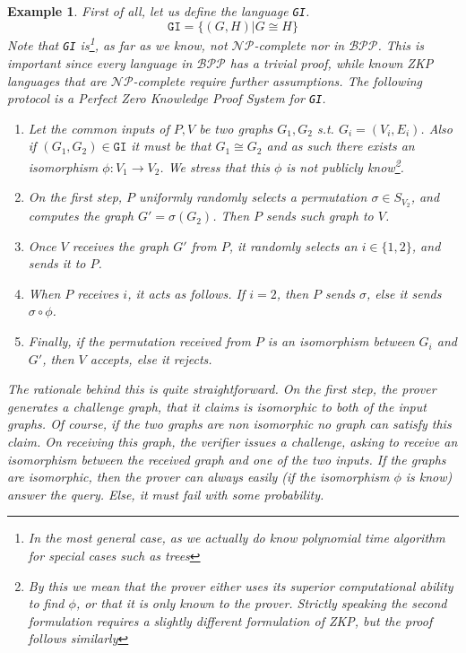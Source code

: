\documentclass{article}
\newtheorem{example}{Example}
\begin{document}
\begin{example}
    First of all, let us define the language \texttt{GI}.
    \[ \texttt{GI} = \{ (G, H) | G \cong H \}\]
    Note that \texttt{GI} is\footnote{In the most general case, as we actually do know polynomial time algorithm for special cases such as trees}, as far as we know, not $\mathcal{NP}$-complete nor in $\mathcal{BPP}$. 
    This is important since every language in $\mathcal{BPP}$ has a trivial proof, while known ZKP languages that are $\mathcal{NP}$-complete require further assumptions.
    The following protocol \cite{goldreichFoundationsCryptographyVol2007} is a Perfect Zero Knowledge Proof System for \texttt{GI}.
    \begin{enumerate}
        \item Let the common inputs of $P, V$ be two graphs $G_1, G_2$ s.t. $G_i = (V_i, E_i)$.
              Also if $(G_1, G_2) \in \texttt{GI}$ it must be that $G_1 \cong G_2$ and as such there exists an 
              isomorphism $\phi : V_1 \to V_2$. We stress that this $\phi$ is not publicly know\footnote{By this we mean that the prover either uses its superior computational ability to find $\phi$, or that it is only known to the prover. Strictly speaking the second formulation requires a slightly different formulation of ZKP, but the proof follows similarly }.
        \item On the first step, $P$ uniformly randomly selects a permutation $\sigma \in S_{V_2}$, and computes the graph $G' = \sigma(G_2)$.
              Then $P$ sends such graph to $V$. 
        \item Once $V$ receives the graph $G'$ from $P$, it randomly selects an $i \in \{1, 2\}$, and sends it to $P$. 
        \item When $P$ receives $i$, it acts as follows. If $i = 2$, then $P$ sends $\sigma$, else it sends $\sigma \circ \phi$.
        \item Finally, if the permutation received from $P$ is an isomorphism between $G_i$ and $G'$, then $V$ accepts, else it rejects.
    \end{enumerate}
    The rationale behind this is quite straightforward. On the first step, the prover generates a challenge graph, that it claims is isomorphic to both of the input graphs.
    Of course, if the two graphs are non isomorphic no graph can satisfy this claim. On receiving this graph, the verifier issues a challenge, asking to receive an isomorphism between the received graph and one of the two inputs.
    If the graphs are isomorphic, then the prover can always easily (if the isomorphism $\phi$ is know) answer the query. Else, it must fail with some probability.

\end{example}
\end{document}
